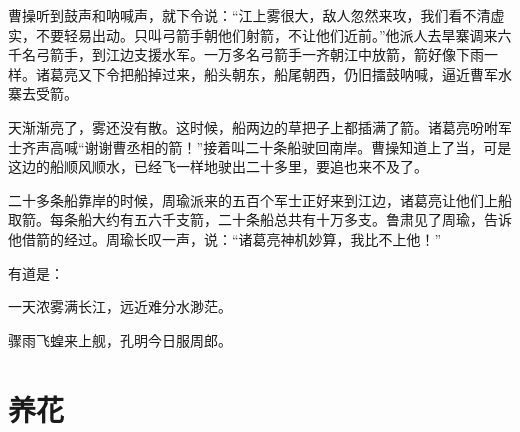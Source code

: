 \documentclass[12pt,UTF-8,openany]{ctexbook}
\begin{document}
\begin{Large}
    曹操听到鼓声和呐喊声，就下令说：“江上雾很大，敌人忽然来攻，我们看不清虚实，不要轻易出动。只叫弓箭手朝他们射箭，不让他们近前。”他派人去旱寨调来六千名弓箭手，到江边支援水军。一万多名弓箭手一齐朝江中放箭，箭好像下雨一样。诸葛亮又下令把船掉过来，船头朝东，船尾朝西，仍旧擂鼓呐喊，逼近曹军水寨去受箭。
    
    天渐渐亮了，雾还没有散。这时候，船两边的草把子上都插满了箭。诸葛亮吩咐军士齐声高喊“谢谢曹丞相的箭！”接着叫二十条船驶回南岸。曹操知道上了当，可是这边的船顺风顺水，已经飞一样地驶出二十多里，要追也来不及了。
    
    二十多条船靠岸的时候，周瑜派来的五百个军士正好来到江边，诸葛亮让他们上船取箭。每条船大约有五六千支箭，二十条船总共有十万多支。鲁肃见了周瑜，告诉他借箭的经过。周瑜长叹一声，说：“诸葛亮神机妙算，我比不上他！”
    
    有道是：
    
    一天浓雾满长江，远近难分水渺茫。
    
    骤雨飞蝗来上舰，孔明今日服周郎。
    
\end{Large}

\chapter{养花}
\end{document}
